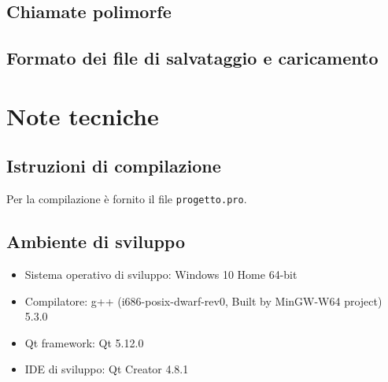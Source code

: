 \documentclass{article}
\newcommand{\code}[1]{\texttt{#1}}
\begin{document}
\subsection{Chiamate polimorfe} %
\label{sub:chiamate_polimorfe}

\subsection{Formato dei file di salvataggio e caricamento} %
\label{sub:formato_dei_file_di_salvataggio_e_caricamento}

\section{Note tecniche} %
\label{sec:note_tecniche}
\subsection{Istruzioni di compilazione} %
\label{sub:istruzioni_di_compilazione}
Per la compilazione è fornito il file \code{progetto.pro}.
\subsection{Ambiente di sviluppo} %
\label{sub:ambiente_di_sviluppo}
\begin{itemize}
	\item Sistema operativo di sviluppo: Windows 10 Home 64-bit
	\item Compilatore: g++ (i686-posix-dwarf-rev0, Built by MinGW-W64 project) 5.3.0
	\item Qt framework: Qt 5.12.0
	\item IDE di sviluppo: Qt Creator 4.8.1
\end{itemize}
\end{document}
